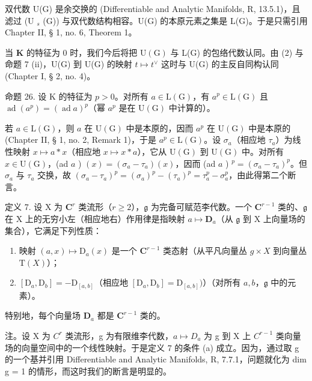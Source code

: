 双代数 U(G) 是余交换的 (Differentiable and Analytic Manifolds, R, 13.5.1)，且滤过 (U \(_{s}\) (G)) 与双代数结构相容。U(G) 的本原元素之集是 L(G)。于是只需引用 Chapter II, § 1, no. 6, Theorem 1。

当 \(\mathbf{K}\) 的特征为 0 时，我们今后将把 \(\mathrm{U}(\mathrm{G})\) 与 L(G) 的包络代数认同。由 (2) 与命题 7 (ii)，U(G) 到 U(G) 的映射 \(t \mapsto t^{\vee}\) 这时与 U(G) 的主反自同构认同 (Chapter I, § 2, no. 4)。

命题 26. 设 K 的特征为 \(p > 0\)。对所有 \(a \in \mathrm{L}(\mathrm{G})\)，有 \(a^p \in \mathrm{L}(\mathrm{G})\) 且 \(\operatorname{ad}(a^p) = (\operatorname{ad} a)^p\)（幂 \(a^p\) 是在 \(\mathrm{U}(\mathrm{G})\) 中计算的）。

若 \(a \in \mathrm{L}(\mathrm{G})\)，则 \(a\) 在 \(\mathrm{U}(\mathrm{G})\) 中是本原的，因而 \(a^p\) 在 \(\mathrm{U}(\mathrm{G})\) 中是本原的 (Chapter II, § 1, no. 2, Remark 1)，于是 \(a^p \in \mathrm{L}(\mathrm{G})\)。设 \(\sigma_a\)（相应地 \(\tau_a\)）为线性映射 \(x \mapsto a * x\)（相应地 \(x \mapsto x * a\)），它从 \(\mathrm{U}(\mathrm{G})\) 到 \(\mathrm{U}(\mathrm{G})\) 中。对所有 \(x \in \mathrm{U}(\mathrm{G})\)，(ad \(a\) ) \((x) = (\sigma_a - \tau_a)(x)\)，因而 (ad \(a\) ) \(^p = (\sigma_a - \tau_a)^p\)。但 \(\sigma_a\) 与 \(\tau_a\) 交换，故 \((\sigma_a - \tau_a)^p = (\sigma_a)^p - (\tau_a)^p = \tau_a^p - \sigma_a^p\)，由此得第二个断言。

定义 7. 设 X 为 \(\mathbf{C}^r\) 类流形（\(r \geqslant 2\)），\(\mathfrak{g}\) 为完备可赋范李代数。一个 \(\mathbf{C}^{r-1}\) 类的、\(\mathfrak{g}\) 在 X 上的无穷小左（相应地右）作用律是指映射 \(a \mapsto \mathbf{D}_a\)（从 \(\mathfrak{g}\) 到 X 上向量场的集合），它满足下列性质：

\begin{enumerate}
\def\labelenumi{(\alph{enumi})}
\item
  映射 \((a, x) \mapsto \mathrm{D}_a(x)\) 是一个 \(\mathbf{C}^{r-1}\) 类态射（从平凡向量丛 \(g \times X\) 到向量丛 \(\mathrm{T}(X)\)）；
\item
  \([\mathrm{D}_a,\mathrm{D}_b] = -\mathrm{D}_{[a,b]}\)（相应地 \([\mathrm{D}_a,\mathrm{D}_b] = \mathrm{D}_{[a,b]})\)）（对所有 \(a,b\)，\(\mathfrak{g}\) 中的元素）。
\end{enumerate}

特别地，每个向量场 \(\mathbf{D}_a\) 都是 \(\mathbf{C}^{r - 1}\) 类的。

注。设 X 为 \(C^{r}\) 类流形，g 为有限维李代数，\(a \mapsto D_{a}\) 为 g 到 X 上 \(C^{r-1}\) 类向量场的向量空间中的一个线性映射。于是定义 7 的条件 (a) 成立。因为，通过取 g 的一个基并引用 Differentiable and Analytic Manifolds, R, 7.7.1，问题就化为 dim g = 1 的情形，而这时我们的断言是明显的。

